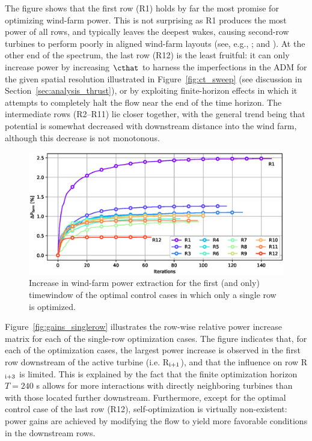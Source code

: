 	The figure shows that the first row (R1) holds by far the most promise for optimizing wind-farm power. This is not surprising as R1 produces the most power of all rows, and typically leaves the deepest wakes, causing second-row turbines to perform  poorly in aligned wind-farm layouts (see, e.g., \citealp{porte2013numerical,nilsson2015large}; and \citealp{stevens2016effects}). At the other end of the spectrum, the last row (R12) is the least fruitful: it can only increase power by increasing $\cthat$ to harness the imperfections in the ADM for the given spatial resolution illustrated in Figure~\ref{fig:ct_sweep} (see discussion in Section~\ref{sec:analysis_thrust}), or by exploiting finite-horizon effects in which it attempts to completely halt the flow near the end of the time horizon. The intermediate rows (R2--R11) lie closer together, with the general trend being that potential is somewhat decreased with downstream distance into the wind farm, although this decrease is not monotonous. 
	
	\begin{figure}
		\centering
		\includegraphics[width=\textwidth]{chapters/analysis_induction_control/single_row_opt.eps}
		\caption{Increase in wind-farm power extraction for the first (and only) timewindow of the optimal control cases in which only a single row is optimized. \label{fig:single_row_opt}}
	\end{figure}

	Figure~\ref{fig:gains_singlerow} illustrates the row-wise relative power increase matrix for each of the single-row optimization cases. The figure indicates that, for each of the optimization cases, the largest power increase is observed in the first row downstream of the active turbine (i.e. R$_{\rm i+1}$), and that the influence on row R$_{\rm i+3}$ is limited. This is explained by the fact that the finite optimization horizon $T = 240$ s allows for more interactions with directly neighboring turbines than with those located further downstream. Furthermore, except for the optimal control case of the last row (R12), self-optimization is virtually non-existent: power gains are achieved by modifying the flow to yield more favorable conditions in the downstream rows. 

